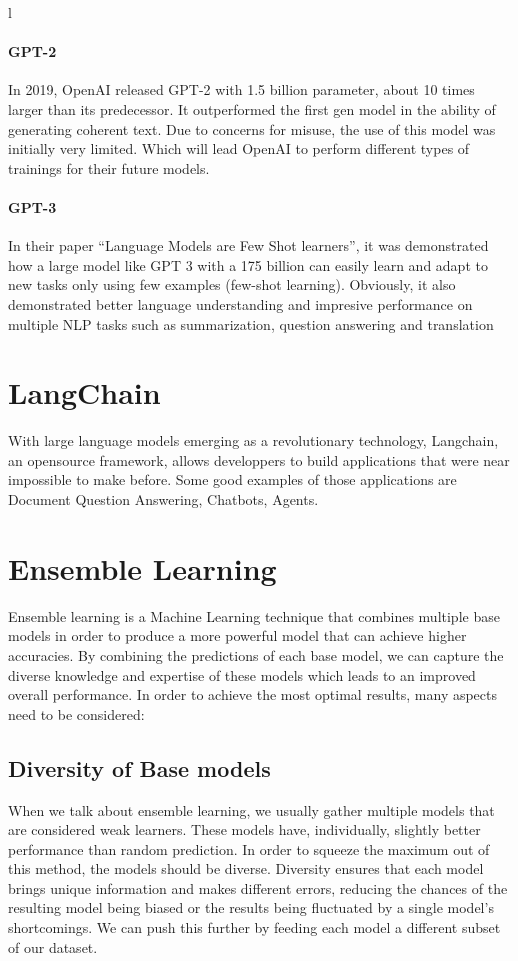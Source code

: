 l\documentclass[a4paper,12pt,twoside]{report}
\begin{document}
\paragraph{GPT-2}
In 2019, OpenAI released GPT-2 with 1.5 billion parameter, about 10 times larger than its predecessor. It outperformed the first gen model in the ability of generating coherent text. Due to concerns for misuse, the use of this model was initially very limited. Which will lead OpenAI to perform different types of trainings for their future models.
\paragraph{GPT-3}
In their paper ``Language Models are Few Shot learners''\cite{brown2020language}, it was demonstrated how a large model like GPT 3 with a 175 billion can easily learn and adapt to new tasks only using few examples (few-shot learning). Obviously, it also demonstrated better language understanding and impresive performance on multiple NLP tasks such as summarization, question answering and translation
\section{LangChain}\label{langchainSec}
With large language models emerging as a revolutionary technology, Langchain\cite{langchain}, an opensource framework, allows developpers to build applications that were near impossible to make before. Some good examples of those applications are Document Question Answering, Chatbots, Agents.
\section{Ensemble Learning}
Ensemble learning is a Machine Learning technique that combines multiple base models in order to produce a more powerful model that can achieve higher accuracies. By combining the predictions of each base model, we can capture the diverse knowledge and expertise of these models which leads to an improved overall performance. In order to achieve the most optimal results, many aspects need to be considered:
\subsection{Diversity of Base models}
When we talk about ensemble learning, we usually gather multiple models that are considered weak learners. These models have, individually, slightly better performance than random prediction. In order to squeeze the maximum out of this method, the models should be diverse. Diversity ensures that each model brings unique information and makes different errors, reducing the chances of the resulting model being biased or the results being fluctuated by a single model's shortcomings. We can push this further by feeding each model a different subset of our dataset.
\end{document}
